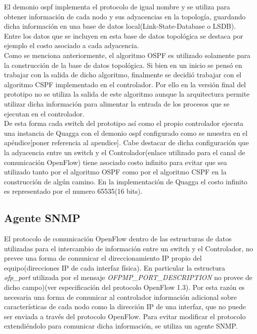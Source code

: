El demonio ospf implementa el protocolo de igual nombre y se utiliza para obtener información de cada nodo y sus adyacencias en la topolog\'ia, guardando dicha información en una base de datos local(Link-State-Database o LSDB). Entre los datos que se incluyen en esta base de datos topol\'ogica se destaca por ejemplo el costo asociado a cada adyacencia.\\ 

Como se menciona anteriormente, el algoritmo OSPF es utilizado solamente para la construcci\'on de la base de datos topol\'ogica. Si bien en un inicio se pensó en trabajar con la salida de dicho algoritmo, finalmente se decidió trabajar con el algoritmo CSPF implementado en el controlador. Por ello en la versi\'on final del prototipo no se utiliza la salida de este algoritmo aunque la arquitectura permite utilizar dicha información para alimentar la entrada de los procesos que se ejecutan en el controlador.\\

De esta forma cada switch del prototipo así como el propio controlador ejecuta una instancia de Quagga con el demonio ospf configurado como se muestra en el apéndice[poner referencia al apendice]. Cabe destacar de dicha configuración que la adyacencia entre un switch y el Controlador(enlace utilizado para el canal de comunicación OpenFlow) tiene asociado costo infinito para evitar que sea utilizado tanto por el algoritmo OSPF como por el algoritmo CSPF en la construcción de algún camino. En la implementaci\'on de Quagga el costo infinito es representado por el numero 65535(16 bits).

\subsection{Agente SNMP}
El protocolo de comunicación OpenFlow dentro de las estructuras de datos utilizadas para el intercambio de información entre un switch y el Controlador, no prevee una forma de comunicar el direccionamiento IP propio del equipo(direcciones IP de cada interfaz física). En particular la estructura \textit{ofp\_port} utilizada por el mensaje \textit{OFPMP\_PORT\_DESCRIPTION} no provee de dicho campo)(ver especificación del protocolo OpenFlow 1.3\citep{ofv133spec}). Por esta razón es necesaria una forma de comunicar al controlador información adicional sobre características de cada nodo como la dirección IP de una interfaz, que no puede ser enviada a través del protocolo OpenFlow. Para evitar modificar el protocolo extendiéndolo para comunicar dicha informaci\'on, se utiliza un agente SNMP.\\

